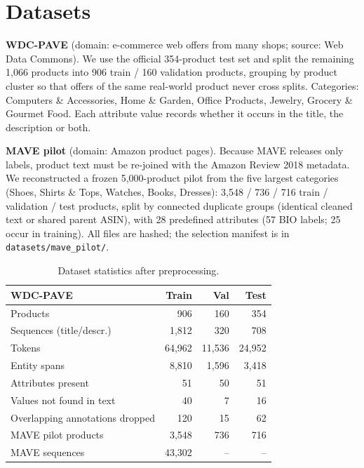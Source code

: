 \documentclass[10pt,twocolumn,a4paper]{article}
\begin{document}
\section{Datasets}
\textbf{WDC-PAVE} \cite{brinkmann2024wdcpave} (domain: e-commerce web offers from many shops; source: Web Data Commons). We use the official 354-product test set and split the remaining 1,066 products into 906 train / 160 validation products, grouping by product cluster so that offers of the same real-world product never cross splits. Categories: Computers \& Accessories, Home \& Garden, Office Products, Jewelry, Grocery \& Gourmet Food. Each attribute value records whether it occurs in the title, the description or both.

\textbf{MAVE pilot} (domain: Amazon product pages). Because MAVE releases only labels, product text must be re-joined with the Amazon Review 2018 metadata. We reconstructed a frozen 5,000-product pilot from the five largest categories (Shoes, Shirts \& Tops, Watches, Books, Dresses): 3,548 / 736 / 716 train / validation / test products, split by connected duplicate groups (identical cleaned text or shared parent ASIN), with 28 predefined attributes (57 BIO labels; 25 occur in training). All files are hashed; the selection manifest is in \texttt{datasets/mave\_pilot/}.

\begin{table}[t]\centering\small
\begin{tabular}{lrrr}\toprule
WDC-PAVE & Train & Val & Test \\\midrule
Products & 906 & 160 & 354 \\
Sequences (title/descr.) & 1,812 & 320 & 708 \\
Tokens & 64,962 & 11,536 & 24,952 \\
Entity spans & 8,810 & 1,596 & 3,418 \\
Attributes present & 51 & 50 & 51 \\
Values not found in text & 40 & 7 & 16 \\
Overlapping annotations dropped & 120 & 15 & 62 \\\midrule
MAVE pilot products & 3,548 & 736 & 716 \\
MAVE sequences & 43,302 & -- & -- \\\bottomrule
\end{tabular}
\caption{Dataset statistics after preprocessing.}\label{tab:data}
\end{table}
\end{document}
